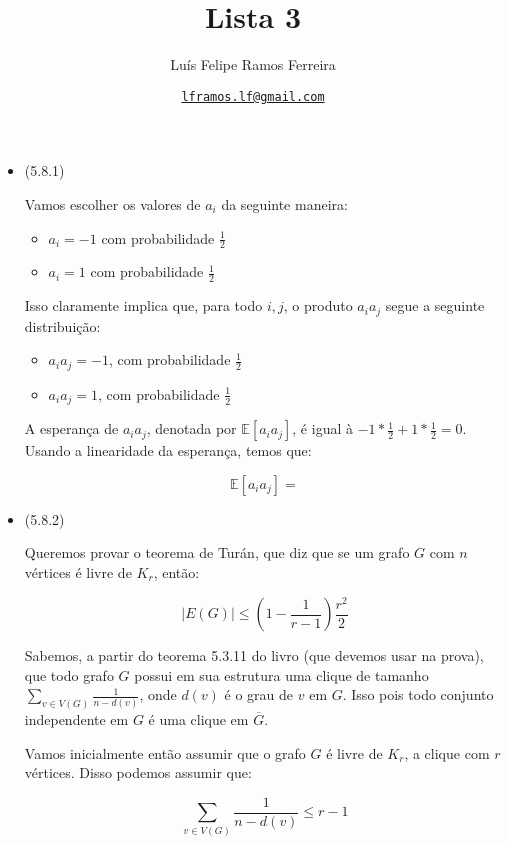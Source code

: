 \documentclass{article}
\title{Lista 3}
\author{Luís Felipe Ramos Ferreira}
\date{\href{mailto:lframos.lf@gmail.com}{\texttt{lframos.lf@gmail.com}}
}
\begin{document}
\maketitle

\begin{itemize}
	\item (5.8.1)

	      Vamos escolher os valores de \(a_i\) da seguinte maneira:
	      \begin{itemize}
		      \item \(a_i = -1\) com probabilidade \(\frac{1}{2}\)
		      \item \(a_i = 1\) com probabilidade \(\frac{1}{2}\)
	      \end{itemize}

	      Isso claramente implica que, para todo \(i, j\), o produto \(a_i a_j\) segue a seguinte distribuição:

	      \begin{itemize}
		      \item \(a_i a_j = -1\), com probabilidade \(\frac{1}{2}\)
		      \item \(a_i a_j = 1\), com probabilidade \(\frac{1}{2}\)
	      \end{itemize}

	      A esperança de \(a_i a_j\), denotada por \(\mathbb{E}[a_i a_j]\), é igual à \(-1 * \frac{1}{2} + 1 * \frac{1}{2} = 0\). Usando a linearidade
	      da esperança, temos que:

	      \[\mathbb{E}[a_i a_j] = \]

	\item (5.8.2)

	      Queremos provar o teorema de Turán, que diz que se um grafo \(G\) com \(n\) vértices é livre de \(K_r\), então:

	      \[|E(G)| \leq (1 - \frac{1}{r-1})\frac{r^2}{2}\]

	      Sabemos, a partir do teorema 5.3.11 do livro (que devemos usar na prova), que todo grafo \(G\) possui em sua estrutura uma clique de tamanho \(\sum_{v \in V(G)} \frac{1}{n - d(v)}\),
	      onde \(d(v)\) é o grau de \(v\) em \(G\). Isso pois todo conjunto independente em \(G\) é uma clique em \(\overline{G}\).

	      Vamos inicialmente então assumir que o grafo \(G\) é livre de \(K_r\), a clique com \(r\) vértices. Disso podemos assumir que:

	      \[\sum_{v \in V(G)} \frac{1}{n - d(v)} \leq r -1\]


\end{itemize}
\end{document}
